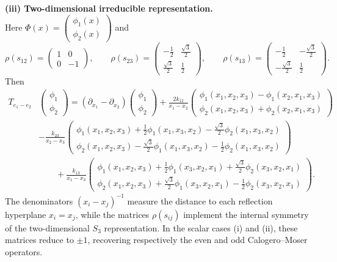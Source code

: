 \documentclass[12pt]{article}
\newcommand{\1}{\mathbbm{1}}
\theoremstyle{definition}
\begin{document}
\noindent\textbf{(iii) Two-dimensional irreducible representation.}\\[2pt]
Here $\Phi(x)=\begin{pmatrix}\phi_1(x)\\ \phi_2(x)\end{pmatrix}$ and
\[
\rho(s_{12})=\begin{pmatrix}1&0\\0&-1\end{pmatrix},\qquad
\rho(s_{23})=\begin{pmatrix}-\tfrac{1}{2}&\tfrac{\sqrt{3}}{2}\\[4pt]\tfrac{\sqrt{3}}{2}&\tfrac{1}{2}\end{pmatrix},\qquad
\rho(s_{13})=\begin{pmatrix}-\tfrac{1}{2}&-\tfrac{\sqrt{3}}{2}\\[4pt]-\tfrac{\sqrt{3}}{2}&\tfrac{1}{2}\end{pmatrix}.
\]
Then
\[
\begin{aligned}
T_{e_1-e_2}&
\begin{pmatrix}\phi_1\\ \phi_2\end{pmatrix}
=(\partial_{x_1}-\partial_{x_2})
\begin{pmatrix}\phi_1\\ \phi_2\end{pmatrix}+ \frac{2k_{12}}{x_1-x_2}
\begin{pmatrix}
\phi_1(x_1,x_2,x_3)-\phi_1(x_2,x_1,x_3)\\[4pt]
\phi_2(x_1,x_2,x_3)+\phi_2(x_2,x_1,x_3)
\end{pmatrix} \\[5pt]
&-\frac{k_{23}}{x_2-x_3}
\begin{pmatrix}
\phi_1(x_1,x_2,x_3)+\tfrac{1}{2}\phi_1(x_1,x_3,x_2)-\tfrac{\sqrt{3}}{2}\phi_2(x_1,x_3,x_2)\\[4pt]
\phi_2(x_1,x_2,x_3)-\tfrac{\sqrt{3}}{2}\phi_1(x_1,x_3,x_2)-\tfrac{1}{2}\phi_2(x_1,x_3,x_2)
\end{pmatrix} \\[5pt]
&\quad \quad +\frac{k_{13}}{x_1-x_3}
\begin{pmatrix}
\phi_1(x_1,x_2,x_3)+\tfrac{1}{2}\phi_1(x_3,x_2,x_1)+\tfrac{\sqrt{3}}{2}\phi_2(x_3,x_2,x_1)\\[4pt]
\phi_2(x_1,x_2,x_3)+\tfrac{\sqrt{3}}{2}\phi_1(x_3,x_2,x_1)-\tfrac{1}{2}\phi_2(x_3,x_2,x_1)
\end{pmatrix}.
\end{aligned}
\]
The denominators $(x_i-x_j)^{-1}$ measure the distance to each reflection
hyperplane $x_i=x_j$, while the matrices $\rho(s_{ij})$ implement the internal
symmetry of the two-dimensional $S_3$ representation.  
In the scalar cases (i) and (ii), these matrices reduce to $\pm 1$, recovering
respectively the even and odd Calogero--Moser operators.
\end{document}
